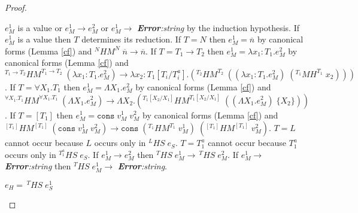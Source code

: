 \begin{theorem}
\begin{proof}
\begin{case}
$e_{M}^{1}$ is a value or $e_{M}^{1}\rightarrow e_{M}^{2}$ or $e_{M}^{1}\rightarrow$ \emph{\textbf{Error}:\;string} by the induction hypothesis.  If $e_{M}^{1}$ is a value then $T$ determines its reduction.  If $T=N$ then $e_{M}^{1}=\overline{n}$ by canonical forms (Lemma \ref{cf}) and $^{N}HM^{N}\;\overline{n}\rightarrow\overline{n}$.  If $T=T_{1}\rightarrow T_{2}$ then $e_{M}^{1}=\lambda x_{1}:T_{1}.e_{M}^{2}$ by canonical forms (Lemma \ref{cf}) and $^{T_{1}\rightarrow T_{2}}HM^{T_{1}\rightarrow T_{2}}\;(\lambda x_{1}:T_{1}.e_{M}^{2})\rightarrow\lambda x_{2}:T_{1}[T_{i}/T^{a}_{i}].(^{T_{2}}HM^{T_{2}}\;((\lambda x_{1}:T_{1}.e_{M}^{2})\;(^{T_{1}}MH^{T_{1}}\;x_{2})))$.  If $T=\forall X_{1}.T_{1}$ then $e_{M}^{1}=\Lambda X_{1}.e_{M}^{2}$ by canonical forms (Lemma \ref{cf}) and $^{\forall X_{1}.T_{1}}HM^{\forall X_{1}.T_{1}}\;(\Lambda X_{1}.e_{M}^{2})\rightarrow\Lambda X_{2}.(^{T_{1}[X_{2}/X_{1}]}HM^{T_{1}[X_{2}/X_{1}]}\;((\Lambda X_{1}.e_{M}^{2})\;\lbrace X_{2}\rbrace))$.  If $T=[T_{1}]$ then $e_{M}^{1}=\mathtt{cons}\;v_{M}^{1}\;v_{M}^{2}$ by canonical forms (Lemma \ref{cf}) and $^{[T_{1}]}HM^{[T_{1}]}\;(\mathtt{cons}\;v_{M}^{1}\;v_{M}^{2})\rightarrow\mathtt{cons}\;(^{T_{1}}HM^{T_{1}}\;v_{M}^{1})\;(^{[T_{1}]}HM^{[T_{1}]}\;v_{M}^{2})$.  $T=L$ cannot occur because $L$ occurs only in $^{L}HS\;e_{S}$.  $T=T_{1}^{a}$ cannot occur because $T_{1}^{a}$ occurs only in $^{T_{1}^{a}}HS\;e_{S}$.  If $e_{M}^{1}\rightarrow e_{M}^{2}$ then $^{T}HS\;e_{M}^{1}\rightarrow\,^{T}HS\;e_{M}^{2}$.  If $e_{M}^{1}\rightarrow$ \emph{\textbf{Error}:\;string} then $^{T}HS\;e_{M}^{1}\rightarrow$ \emph{\textbf{Error}:\;string}.
\end{case}
\begin{case}
$e_{H}=\,^{T}HS\;e_{S}^{1}$


\end{case}
\end{proof}
\end{theorem}
